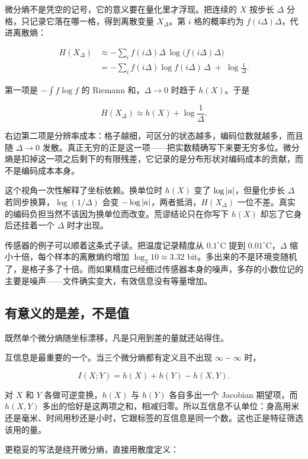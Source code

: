 微分熵不是凭空的记号，它的意义要在量化里才浮现。把连续的 \(X\) 按步长 \(\Delta\) 分格，只记录它落在哪一格，得到离散变量 \(X_\Delta\)。第 \(i\) 格的概率约为 \(f(i\Delta)\Delta\)，代进离散熵：

\[
\begin{aligned}
H(X_\Delta)
&\approx -\sum_i f(i\Delta)\Delta\,\log\bigl(f(i\Delta)\Delta\bigr)\\
&= -\sum_i f(i\Delta)\log f(i\Delta)\,\Delta\;+\;\log\frac{1}{\Delta}.
\end{aligned}
\]

第一项是 \(-\int f\log f\) 的 Riemann 和，\(\Delta\to0\) 时趋于 \(h(X)\)。于是

\[
H(X_\Delta)\approx h(X)+\log\frac{1}{\Delta}.
\]

右边第二项是分辨率成本：格子越细，可区分的状态越多，编码位数就越多，而且随 \(\Delta\to0\) 发散。真正无穷的正是这一项——把实数精确写下来要无穷多位。微分熵是扣掉这一项之后剩下的有限残差，它记录的是分布形状对编码成本的贡献，而不是编码成本本身。

这个视角一次性解释了坐标依赖。换单位时 \(h(X)\) 变了 \(\log\left|a\right|\)，但量化步长 \(\Delta\) 若同步换算，\(\log(1/\Delta)\) 会变 \(-\log\left|a\right|\)，两者抵消，\(H(X_\Delta)\) 一位不差。真实的编码负担当然不该因为换单位而改变。荒谬结论只在你写下 \(h(X)\) 却忘了它身后还挂着一个 \(\Delta\) 时才出现。

传感器的例子可以顺着这条式子读。把温度记录精度从 \(0.1^\circ\mathrm{C}\) 提到 \(0.01^\circ\mathrm{C}\)，\(\Delta\) 缩小十倍，每个样本的离散熵约增加 \(\log_2 10\approx3.32\) bit。多出来的不是环境变随机了，是格子多了十倍。而如果精度已经细过传感器本身的噪声，多存的小数位记的主要是噪声——文件确实变大，有效信息没有等量增加。

\subsection{有意义的是差，不是值}

既然单个微分熵随坐标漂移，凡是只用到差的量就还站得住。

互信息是最重要的一个。当三个微分熵都有定义且不出现 \(\infty-\infty\) 时，

\[
I(X;Y)=h(X)+h(Y)-h(X,Y).
\]

对 \(X\) 和 \(Y\) 各做可逆变换，\(h(X)\) 与 \(h(Y)\) 各自多出一个 Jacobian 期望项，而 \(h(X,Y)\) 多出的恰好是这两项之和，相减归零。所以互信息不认单位：身高用米还是毫米、时间用秒还是小时，它跟标签的互信息是同一个数。这也正是特征筛选该用的量。

更稳妥的写法是绕开微分熵，直接用散度定义：


